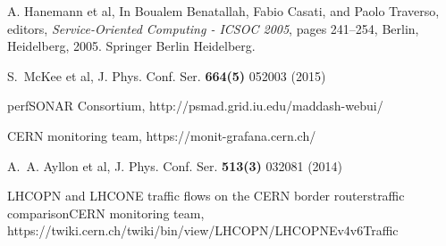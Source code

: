\begin{thebibliography}{}
A. Hanemann et al, 
\newblock In Boualem Benatallah, Fabio Casati, and Paolo Traverso, editors,
  {\em Service-Oriented Computing - ICSOC 2005}, pages 241--254, Berlin, Heidelberg, 2005. Springer Berlin Heidelberg.

S.~McKee et al, J. Phys. Conf. Ser. {\bf 664(5)} 052003 (2015)


perfSONAR Consortium,
http://psmad.grid.iu.edu/maddash-webui/

CERN monitoring team,
https://monit-grafana.cern.ch/

A.~A. Ayllon et al, 
J. Phys. Conf. Ser. {\bf 513(3)} 032081 (2014)

LHCOPN and LHCONE traffic flows on the CERN border routerstraffic comparisonCERN monitoring team,
https://twiki.cern.ch/twiki/bin/view/LHCOPN/LHCOPNEv4v6Traffic


 







\end{thebibliography}
